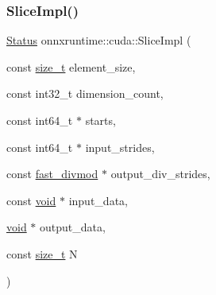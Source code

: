 \mbox{\label{namespaceonnxruntime_1_1cuda_a678b6e6f4618cbc0b55e3a68111d894d}} 
\subsubsection{\texorpdfstring{Slice\+Impl()}{SliceImpl()}}
{\footnotesize\ttfamily \mbox{\hyperlink{classonnxruntime_1_1common_1_1Status}{Status}} onnxruntime\+::cuda\+::\+Slice\+Impl (\begin{DoxyParamCaption}\item[{const \mbox{\hyperlink{mlasi_8h_a503efbc1c6e50825320ad909366b78ab}{size\+\_\+t}}}]{element\+\_\+size,  }\item[{const int32\+\_\+t}]{dimension\+\_\+count,  }\item[{const int64\+\_\+t $\ast$}]{starts,  }\item[{const int64\+\_\+t $\ast$}]{input\+\_\+strides,  }\item[{const \mbox{\hyperlink{classonnxruntime_1_1cuda_1_1fast__divmod}{fast\+\_\+divmod}} $\ast$}]{output\+\_\+div\+\_\+strides,  }\item[{const \mbox{\hyperlink{mlasi_8h_a88f941d423cb2a819b70a1358982b1a6}{void}} $\ast$}]{input\+\_\+data,  }\item[{\mbox{\hyperlink{mlasi_8h_a88f941d423cb2a819b70a1358982b1a6}{void}} $\ast$}]{output\+\_\+data,  }\item[{const \mbox{\hyperlink{mlasi_8h_a503efbc1c6e50825320ad909366b78ab}{size\+\_\+t}}}]{N }\end{DoxyParamCaption})}

\mbox{\label{namespaceonnxruntime_1_1cuda_a87fd1918977bb7b705e1c56d6524e5b2}} 
